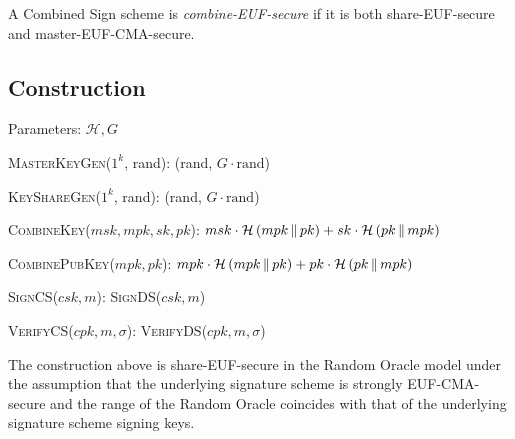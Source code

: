     \begin{definition}
      A Combined Sign scheme is \emph{\textsf{combine-EUF}-secure} if it is both
      \textsf{share-EUF}-secure and \textsf{master-EUF-CMA}-secure.
    \end{definition}

  \subsection{Construction}
    Parameters: $\mathcal{H}, G$
    \begin{algorithmic}[0]
      \State \textsc{MasterKeyGen}($1^k$, rand):
      \Indent
        \State \Return (rand, $G \cdot \mathrm{rand}$)
      \EndIndent
    \end{algorithmic}

    \begin{algorithmic}[0]
      \State \textsc{KeyShareGen}($1^k$, rand):
      \Indent
        \State \Return (rand, $G \cdot \mathrm{rand}$)
      \EndIndent
    \end{algorithmic}

    \begin{algorithmic}[0]
      \State \textsc{CombineKey}($msk, mpk, sk, pk$):
      \Indent
        \State \Return $msk \cdot \mathcal{H}\left(mpk \,\|\, pk\right) + sk
        \cdot \mathcal{H}\left(pk \,\|\, mpk\right)$
      \EndIndent
    \end{algorithmic}

    \begin{algorithmic}[0]
      \State \textsc{CombinePubKey}($mpk, pk$):
      \Indent
        \State \Return $mpk \cdot \mathcal{H}\left(mpk \,\|\, pk\right) + pk
        \cdot \mathcal{H}\left(pk \,\|\, mpk\right)$
      \EndIndent
    \end{algorithmic}

    \begin{algorithmic}[0]
      \State \textsc{SignCS}($csk, m$):
      \Indent
        \State \Return \textsc{SignDS}($csk, m$)
      \EndIndent
    \end{algorithmic}

    \begin{algorithmic}[0]
      \State \textsc{VerifyCS}($cpk, m, \sigma$):
      \Indent
        \State \Return \textsc{VerifyDS}($cpk, m, \sigma$)
      \EndIndent
    \end{algorithmic}

    \begin{lemma}
      \label{lemma:comb:share}
      The construction above is \textsf{share-EUF}-secure in the Random Oracle
      model under the assumption that the underlying signature scheme is
      strongly \textsf{EUF-CMA}-secure and the range of the Random Oracle
      coincides with that of the underlying signature scheme signing keys.
    \end{lemma}

